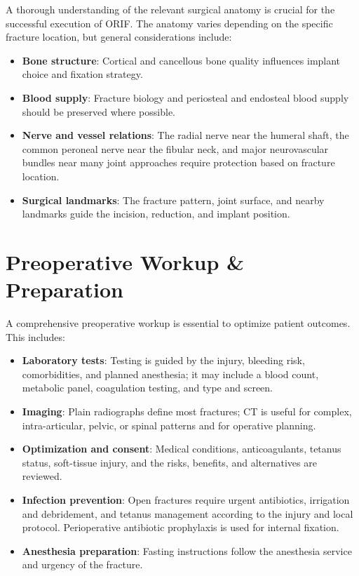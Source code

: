 A thorough understanding of the relevant surgical anatomy is crucial for the successful execution of ORIF. The anatomy varies depending on the specific fracture location, but general considerations include:

\begin{itemize}
  \item \textbf{Bone structure}: Cortical and cancellous bone quality influences implant choice and fixation strategy.
  \item \textbf{Blood supply}: Fracture biology and periosteal and endosteal blood supply should be preserved where possible.
  \item \textbf{Nerve and vessel relations}: The radial nerve near the humeral shaft, the common peroneal nerve near the fibular neck, and major neurovascular bundles near many joint approaches require protection based on fracture location.
  \item \textbf{Surgical landmarks}: The fracture pattern, joint surface, and nearby landmarks guide the incision, reduction, and implant position.
\end{itemize}

\section*{Preoperative Workup \& Preparation}

A comprehensive preoperative workup is essential to optimize patient outcomes. This includes:

\begin{itemize}
  \item \textbf{Laboratory tests}: Testing is guided by the injury, bleeding risk, comorbidities, and planned anesthesia; it may include a blood count, metabolic panel, coagulation testing, and type and screen.
  \item \textbf{Imaging}: Plain radiographs define most fractures; CT is useful for complex, intra-articular, pelvic, or spinal patterns and for operative planning.
  \item \textbf{Optimization and consent}: Medical conditions, anticoagulants, tetanus status, soft-tissue injury, and the risks, benefits, and alternatives are reviewed.
  \item \textbf{Infection prevention}: Open fractures require urgent antibiotics, irrigation and debridement, and tetanus management according to the injury and local protocol. Perioperative antibiotic prophylaxis is used for internal fixation.
  \item \textbf{Anesthesia preparation}: Fasting instructions follow the anesthesia service and urgency of the fracture.
\end{itemize}

